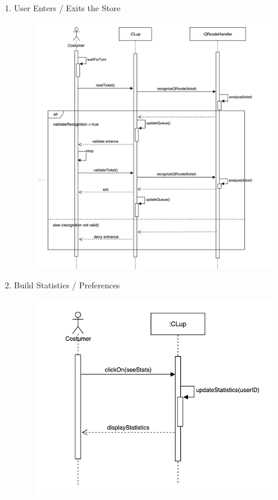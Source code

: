 \documentclass[]{article}
\begin{document}
\begin{enumerate}
						\newpage
						\item User Enters / Exits the Store
							\begin{figure}[H]
								\centering
								\includegraphics[scale=0.9]{enterexit.png}
								\caption{}
								\label{fig:enterexit_sequencediagram}
							\end{figure}

						\newpage	
						\item Build Statistics / Preferences
							\begin{figure}[H]
								\centering
								\includegraphics[scale=0.8]{buildStats.png}
								\caption{}
								\label{fig:buildstats_sequencediagram}
							\end{figure}
						

\end{enumerate}
\end{document}
